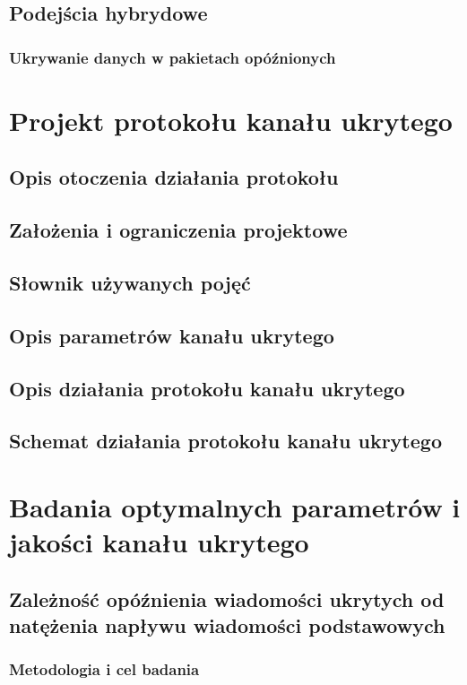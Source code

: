\documentclass[a4paper, twoside]{report}
\begin{document}
    \section{Podejścia hybrydowe}
        \subsection{Ukrywanie danych w pakietach opóźnionych}


\chapter{Projekt protokołu kanału ukrytego}
    \section{Opis otoczenia działania protokołu}
    \section{Założenia i ograniczenia projektowe}
    \section{Słownik używanych pojęć}
    \section{Opis parametrów kanału ukrytego}
    \section{Opis działania protokołu kanału ukrytego}
    \section{Schemat działania protokołu kanału ukrytego}

\chapter{Badania optymalnych parametrów i jakości kanału ukrytego}
    \section{Zależność opóźnienia wiadomości ukrytych od natężenia napływu wiadomości podstawowych}
        \subsection{Metodologia i cel badania}
\end{document}
